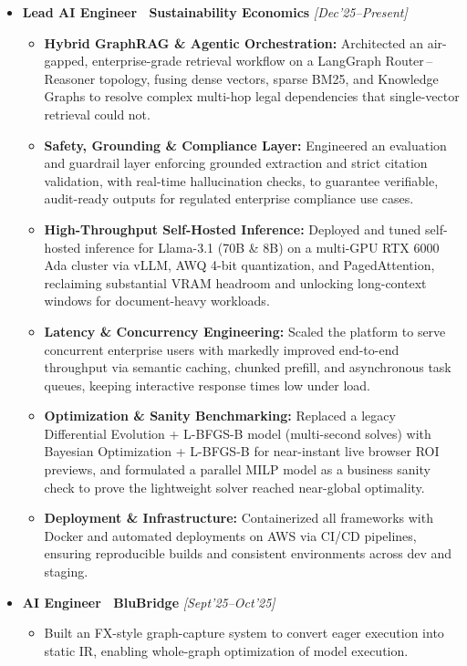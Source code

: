 \documentclass[10pt,article]{article}
\begin{document}
\begin{itemize}
   \item \textbf{Lead AI Engineer \textbar\ Sustainability Economics} \hfill \textit{[Dec'25--Present]}
   \begin{itemize}
       \item \textbf{Hybrid GraphRAG \& Agentic Orchestration:} Architected an air-gapped, enterprise-grade retrieval workflow on a LangGraph Router\,--\,Reasoner topology, fusing dense vectors, sparse BM25, and Knowledge Graphs to resolve complex multi-hop legal dependencies that single-vector retrieval could not.
       \item \textbf{Safety, Grounding \& Compliance Layer:} Engineered an evaluation and guardrail layer enforcing grounded extraction and strict citation validation, with real-time hallucination checks, to guarantee verifiable, audit-ready outputs for regulated enterprise compliance use cases.
       \item \textbf{High-Throughput Self-Hosted Inference:} Deployed and tuned self-hosted inference for Llama-3.1 (70B \& 8B) on a multi-GPU RTX 6000 Ada cluster via vLLM, AWQ 4-bit quantization, and PagedAttention, reclaiming substantial VRAM headroom and unlocking long-context windows for document-heavy workloads.
       \item \textbf{Latency \& Concurrency Engineering:} Scaled the platform to serve concurrent enterprise users with markedly improved end-to-end throughput via semantic caching, chunked prefill, and asynchronous task queues, keeping interactive response times low under load.
       \item \textbf{Optimization \& Sanity Benchmarking:} Replaced a legacy Differential Evolution + L-BFGS-B model (multi-second solves) with Bayesian Optimization + L-BFGS-B for near-instant live browser ROI previews, and formulated a parallel MILP model as a business sanity check to prove the lightweight solver reached near-global optimality.
       \item \textbf{Deployment \& Infrastructure:} Containerized all frameworks with Docker and automated deployments on AWS via CI/CD pipelines, ensuring reproducible builds and consistent environments across dev and staging.
   \end{itemize}
   \item \textbf{AI Engineer \textbar\ BluBridge} \hfill \textit{[Sept'25--Oct'25]}
   \begin{itemize}
       \item Built an FX-style graph-capture system to convert eager execution into static IR, enabling whole-graph optimization of model execution.

\end{itemize}
\end{itemize}
\end{document}
